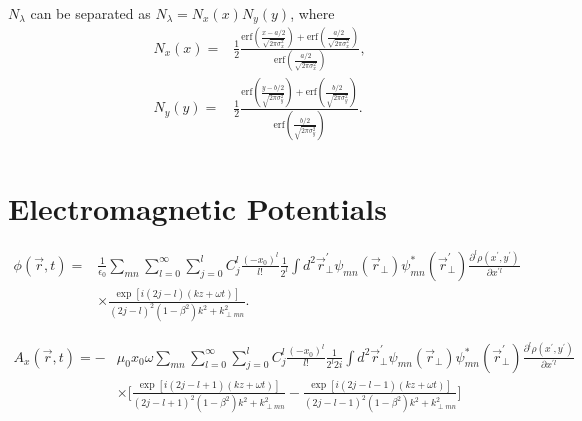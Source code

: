 \documentclass[11pt,oneside]{article}
\begin{document}
  $N_{\lambda}$ can be separated as $N_{\lambda}= N_{x} (x) N_{y} (y)$, where
\begin{equation}
\begin{split}
  N_{x} (x)
= & \frac{1}{2}
    \frac{
      \mbox{erf} \left( \frac{x-a/2}{\sqrt{2 \pi \sigma_{x}^{2}}} \right)
    + \mbox{erf} \left( \frac{a/2}{\sqrt{2 \pi \sigma_{x}^{2}}} \right)
         }
         {
      \mbox{erf} \left( \frac{a/2}{\sqrt{2 \pi \sigma_{x}^{2}}} \right)
         } , \\
  N_{y} (y)
= & \frac{1}{2}
    \frac{
      \mbox{erf} \left( \frac{y-b/2}{\sqrt{2 \pi \sigma_{y}^{2}}} \right)
    + \mbox{erf} \left( \frac{b/2}{\sqrt{2 \pi \sigma_{y}^{2}}} \right)
         }
         {
      \mbox{erf} \left( \frac{b/2}{\sqrt{2 \pi \sigma_{y}^{2}}} \right)
         } . \\
\end{split}
\end{equation}



\clearpage
\section{Electromagnetic Potentials}

\begin{equation}
\begin{split}
  \phi \left( \vec{r},t \right)
= & \frac{1}{\epsilon_{0}} \sum_{mn} \sum_{l=0}^{\infty} \sum_{j=0}^{l}
    C_{j}^{l} \frac{ (-x_{0})^{l} }{ l! } \frac{1}{2^{l}}
    \int d^{2} \vec{r}_{\perp}^{\prime}
    \psi_{mn} \left( \vec{r}_{\perp} \right) 
    \psi_{mn}^{*} \left( \vec{r}_{\perp}^{\prime} \right)
    \frac{ \partial^{l} \rho \left( x^{\prime}, y^{\prime} \right) }
         { \partial x^{\prime l} } \\
  & \times
    \frac{ \exp \left[ i (2j-l)(kz+\omega t) \right] }
         { (2j-l)^{2} \left( 1 - \beta^{2} \right) k^{2} + k_{\perp mn}^{2} } .
\end{split}
\end{equation}

\begin{equation}
\begin{split}
  A_{x} \left( \vec{r},t \right) = 
- & \mu_{0} x_{0} \omega \sum_{mn} \sum_{l=0}^{\infty} \sum_{j=0}^{l}
    C_{j}^{l} \frac{ (-x_{0})^{l} }{ l! } \frac{1}{2^{l}2i}
    \int d^{2} \vec{r}_{\perp}^{\prime}
    \psi_{mn} \left( \vec{r}_{\perp} \right)
    \psi_{mn}^{*} \left( \vec{r}_{\perp}^{\prime} \right)
    \frac{ \partial^{l} \rho \left( x^{\prime}, y^{\prime} \right) }
         { \partial x^{\prime l} } \\
  & \times
    \Bigg[
    \frac{ \exp \left[ i (2j-l+1)(kz+\omega t) \right] }
         { (2j-l+1)^{2} \left( 1 - \beta^{2} \right) k^{2} + k_{\perp mn}^{2} }
  - \frac{ \exp \left[ i (2j-l-1)(kz+\omega t) \right] }
         { (2j-l-1)^{2} \left( 1 - \beta^{2} \right) k^{2} + k_{\perp mn}^{2} }
    \Bigg]
\end{split}
\end{equation}
\end{document}
